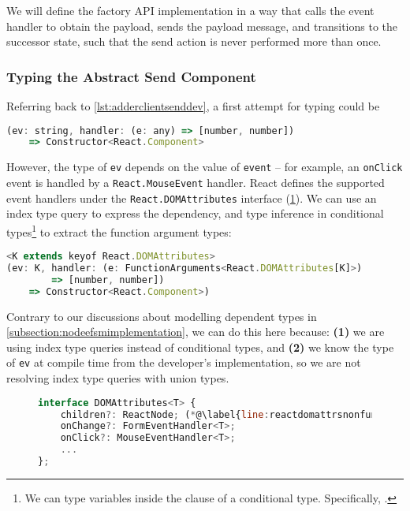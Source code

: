 We will define the factory API implementation in a way that
calls the event handler to obtain the payload,
sends the payload message, and transitions to the successor state,
such that the send action is never performed more than once.

\subsubsection{Typing the Abstract Send Component}
Referring back to \cref{lst:adderclientsenddev},
a first attempt for typing  could be

\begin{lstlisting}[language=javascript,numbers=none]
(ev: string, handler: (e: any) => [number, number]) 
	=> Constructor<React.Component>
\end{lstlisting}

However, the type of \texttt{ev} depends on the value of
\texttt{event} -- for example, an \texttt{onClick} event
is handled by a \texttt{React.MouseEvent} handler.
React defines the supported event handlers under the
\texttt{React.DOMAttributes} interface (\cref{lst:reactdomattrs}).
We can use an index type query to express the dependency,
and type inference in conditional types\footnote{
We can  type variables inside the
 clause of a conditional type.
Specifically, .
}
to extract the function argument types:

\begin{lstlisting}[language=javascript,numbers=none]
<K extends keyof React.DOMAttributes>
(ev: K, handler: (e: FunctionArguments<React.DOMAttributes[K]>) 
		=> [number, number])
	=> Constructor<React.Component>)
\end{lstlisting}

Contrary to our discussions about modelling dependent types in
\cref{subsection:nodeefsmimplementation}, we can do this here
because: \textbf{(1)} we are using index type queries instead
of conditional types, and \textbf{(2)} we know the type
of \texttt{ev} at compile time from the developer's implementation,
so we are not resolving index type queries with union types.

\begin{figure}[!h]
\begin{lstlisting}[language=javascript,numbers=none]
interface DOMAttributes<T> {
	children?: ReactNode; (*@\label{line:reactdomattrsnonfunc}@*)
	onChange?: FormEventHandler<T>;
	onClick?: MouseEventHandler<T>;
	...
};
\end{lstlisting}
\label{lst:reactdomattrs}
\end{figure}

